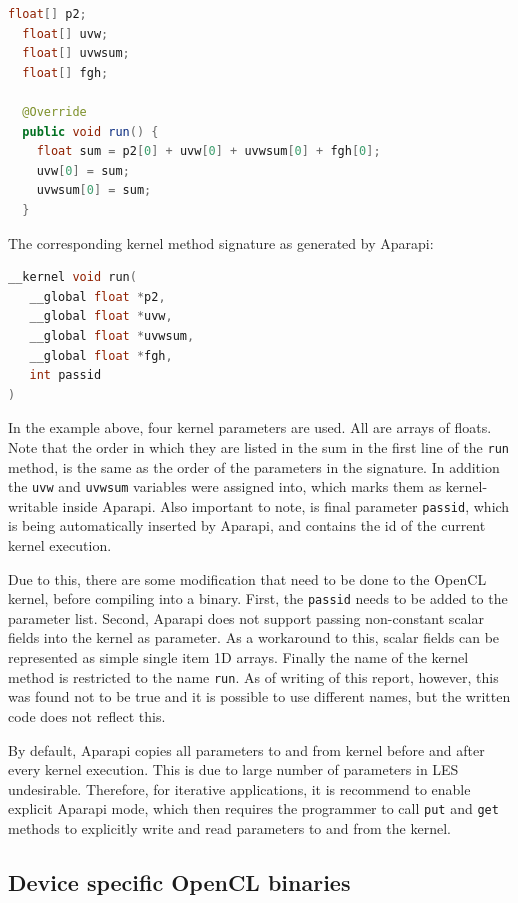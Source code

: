 \documentclass{l4proj}
\begin{document}
\begin{lstlisting}[language=Java]
  float[] p2;
  float[] uvw;
  float[] uvwsum;
  float[] fgh;

  @Override
  public void run() {
    float sum = p2[0] + uvw[0] + uvwsum[0] + fgh[0];
    uvw[0] = sum;
    uvwsum[0] = sum;
  }
\end{lstlisting}
The corresponding kernel method signature as generated by Aparapi:
\begin{lstlisting}[language=C]
__kernel void run(
   __global float *p2, 
   __global float *uvw, 
   __global float *uvwsum, 
   __global float *fgh,
   int passid
)
\end{lstlisting}
In the example above, four kernel parameters are used. All are arrays of floats.
Note that the order in which they are listed in the sum in the first line of the 
\texttt{run} method, is the same as the order of the parameters in the signature.
In addition the \texttt{uvw} and \texttt{uvwsum} variables were assigned into,
which marks them as kernel-writable inside Aparapi. Also important to note,
is final parameter \texttt{passid}, which is being automatically inserted by Aparapi,
and contains the id of the current kernel execution.

Due to this, there are some modification that need to be done to the OpenCL
kernel, before compiling into a binary. First, the \texttt{passid} needs to be added to
the parameter list. Second, Aparapi does not support passing non-constant scalar fields
into the kernel as parameter. As a workaround to this, scalar fields can be represented
as simple single item 1D arrays. Finally the name of the kernel method is restricted to
the name \texttt{run}. As of writing of this report, however, this was found not to be true
and it is possible to use different names, but the written code does not reflect this.

By default, Aparapi copies all parameters to and from kernel before and after every kernel
execution. This is due to large number of parameters in LES undesirable. Therefore, for
iterative applications, it is recommend to enable explicit Aparapi mode, which then requires
the programmer to call \texttt{put} and \texttt{get} methods to explicitly write and read 
parameters to and from the kernel.

\subsection{Device specific OpenCL binaries}
\end{document}
